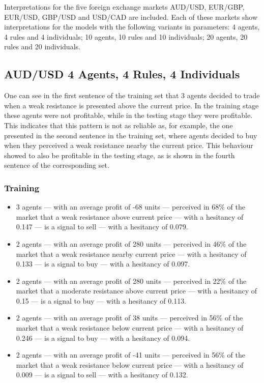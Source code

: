 Interpretations for the five foreign exchange markets AUD/USD, EUR/GBP, EUR/USD,
GBP/USD and USD/CAD are included. Each of these markets show interpretations for
the models with the following variants in parameters: 4 agents, 4 rules and 4
individuals; 10 agents, 10 rules and 10 individuals; 20 agents, 20 rules and 20
individuals.

\subsection{AUD/USD 4 Agents, 4 Rules, 4 Individuals}
\label{}

One can see in the first sentence of the training set that 3 agents decided to trade when a weak resistance is presented above the current price. In the training stage these agents were not profitable, while in the testing stage they were profitable. This indicates that this pattern is not as reliable as, for example, the one presented in the second sentence in the training set, where agents decided to buy when they perceived a weak resistance nearby the current price. This behaviour showed to also be profitable in the testing stage, as is shown in the fourth sentence of the corresponding set.

\subsubsection{Training}
\label{}

{\small
  \begin{itemize}
  \item 3 agents — with an average profit of -68 units — perceived in 68\% of
    the market that a weak resistance above current price — with a hesitancy of
    0.147 — is a signal to sell — with a hesitancy of 0.079.
  \item 2 agents — with an average profit of 280 units — perceived in 46\% of
    the market that a weak resistance nearby current price — with a hesitancy of
    0.133 — is a signal to buy — with a hesitancy of 0.097.
  \item 2 agents — with an average profit of 280 units — perceived in 22\% of
    the market that a moderate resistance above current price — with a hesitancy
    of 0.15 — is a signal to buy — with a hesitancy of 0.113.
  \item 2 agents — with an average profit of 38 units — perceived in 56\% of the
    market that a weak resistance below current price — with a hesitancy of
    0.246 — is a signal to buy — with a hesitancy of 0.094.
  \item 2 agents — with an average profit of -41 units — perceived in 56\% of
    the market that a weak resistance below current price — with a hesitancy of
    0.009 — is a signal to sell — with a hesitancy of 0.132.
  \end{itemize}
}

